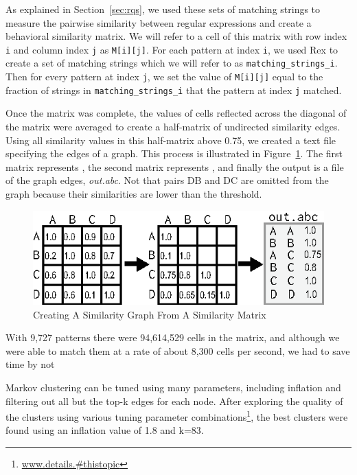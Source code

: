 As explained in Section~\ref{sec:rqs}, we used these sets of matching strings to  measure the pairwise similarity between regular expressions and create a behavioral similarity matrix.  We will refer to a cell of this matrix with row index {\tt i} and column index {\tt j} as {\tt M[i][j]}.  For each pattern at index {\tt i}, we used Rex to create a set of matching strings which we will refer to as {\tt matching\_strings\_i}.  Then for every pattern at index {\tt j}, we set the value of {\tt M[i][j]} equal to the fraction of strings in {\tt matching\_strings\_i} that the pattern at index {\tt j} matched.

Once the matrix was complete, the values of cells reflected across the diagonal of the matrix were averaged to create a half-matrix of undirected similarity edges.  Using all similarity values in this half-matrix above 0.75, we created a text file specifying the edges of a graph.  This process is illustrated in Figure~\ref{fig:matrixToGraph}.
The first matrix represents , the second matrix represents , and finally the output is a file of the graph edges, \emph{out.abc}.
 Not that pairs DB and DC are omitted from the graph because their similarities are lower than the threshold.



\begin{figure}[tb]
\centering
\includegraphics[width=\columnwidth]{../illustrations/matrixToGraph.eps}
\caption{Creating A Similarity Graph From A Similarity Matrix}
\label{fig:matrixToGraph}
\end{figure}



With 9,727 patterns there were 94,614,529 cells in the matrix, and although we were able to match them at a rate of about 8,300 cells per second, we had to save time by not

Markov clustering can be tuned using many parameters, including inflation and filtering out all but the top-k edges for each node.  After exploring the quality of the clusters using various tuning parameter combinations\footnote{\url{www.details.#thistopic}}, the best clusters were found using an inflation value of 1.8 and k=83.

